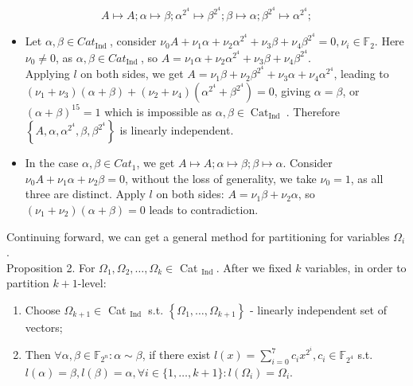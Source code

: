 \documentclass[10pt]{article}
\begin{document}
$$
A \mapsto A ; \alpha \mapsto \beta ; \alpha^{2^{4}} \mapsto \beta^{2^{4}} ; \beta \mapsto \alpha ; \beta^{2^{4}} \mapsto \alpha^{2^{4}} ;
$$

\begin{itemize}
  \item Let $\alpha, \beta \in C a t_{\text {Ind }}$, consider $\nu_{0} A+\nu_{1} \alpha+\nu_{2} \alpha^{2^{4}}+\nu_{3} \beta+\nu_{4} \beta^{2^{4}}=0, \nu_{i} \in \mathbb{F}_{2}$. Here $\nu_{0} \neq 0$, as $\alpha, \beta \in C a t_{\text {Ind }}$, so $A=\nu_{1} \alpha+\nu_{2} \alpha^{2^{4}}+\nu_{3} \beta+\nu_{4} \beta^{2^{4}}$.\\
Applying $l$ on both sides, we get $A=\nu_{1} \beta+\nu_{2} \beta^{2^{4}}+\nu_{3} \alpha+\nu_{4} \alpha^{2^{4}}$, leading to $\left(\nu_{1}+\nu_{3}\right)(\alpha+\beta)+\left(\nu_{2}+\nu_{4}\right)\left(\alpha^{2^{4}}+\beta^{2^{4}}\right)=0$, giving $\alpha=\beta$, or $(\alpha+\beta)^{15}=1$ which is impossible as $\alpha, \beta \in \operatorname{Cat}_{\text {Ind }}$. Therefore $\left\{A, \alpha, \alpha^{2^{4}}, \beta, \beta^{2^{4}}\right\}$ is linearly independent.
  \item In the case $\alpha, \beta \in C a t_{1}$, we get $A \mapsto A ; \alpha \mapsto \beta ; \beta \mapsto \alpha$. Consider $\nu_{0} A+\nu_{1} \alpha+\nu_{2} \beta=0$, without the loss of generality, we take $\nu_{0}=1$, as all three are distinct. Apply $l$ on both sides: $A=\nu_{1} \beta+\nu_{2} \alpha$, so $\left(\nu_{1}+\nu_{2}\right)(\alpha+\beta)=0$ leads to contradiction.
\end{itemize}

Continuing forward, we can get a general method for partitioning for variables $\Omega_{i}$.\\
Proposition 2. For $\Omega_{1}, \Omega_{2}, \ldots, \Omega_{k} \in$ Cat $_{\text {Ind }}$. After we fixed $k$ variables, in order to partition $k+1$-level:

\begin{enumerate}
  \item Choose $\Omega_{k+1} \in$ Cat $_{\text {Ind }}$ s.t. $\left\{\Omega_{1}, \ldots, \Omega_{k+1}\right\}$ - linearly independent set of vectors;
  \item Then $\forall \alpha, \beta \in \mathbb{F}_{2^{n}}: \alpha \sim \beta$, if there exist $l(x)=\sum_{i=0}^{7} c_{i} x^{2^{i}}, c_{i} \in \mathbb{F}_{2^{4}}$ s.t. $l(\alpha)=\beta, l(\beta)= \alpha, \forall i \in\{1, \ldots, k+1\}: l\left(\Omega_{i}\right)=\Omega_{i}$.
\end{enumerate}
\end{document}

